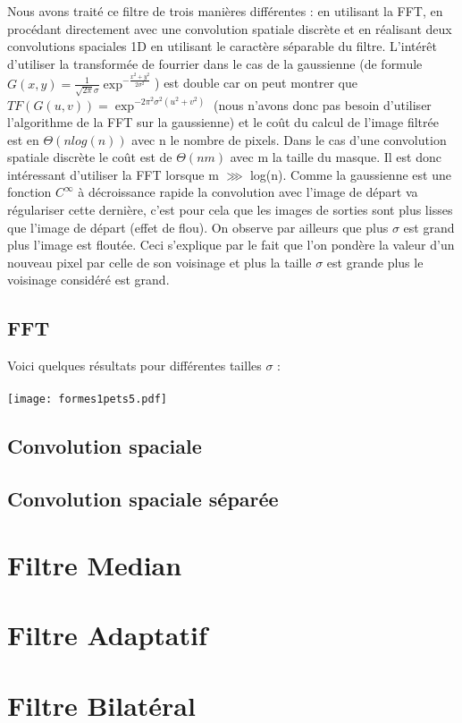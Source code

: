 \documentclass[12pt]{article}
\numberwithin{equation}{section}
\begin{document}
Nous avons traité ce filtre de trois manières différentes : en utilisant la FFT, en procédant directement avec une convolution spatiale discrète et en réalisant deux convolutions spaciales 1D en utilisant le caractère séparable du filtre. L'intérêt d'utiliser la transformée de fourrier dans le cas de la gaussienne (de formule $G(x,y) = \frac{1}{\sqrt{2\pi }\sigma}\exp^{-\frac{x^2 + y^2}{2\sigma^2}}$) est double car on peut montrer que $TF(G(u,v)) = \exp^{-2\pi^2 \sigma^2(u^2 + v^2)}$ (nous n'avons donc pas besoin d'utiliser l'algorithme de la FFT sur la gaussienne) et le coût du calcul de l'image filtrée est en $\Theta(nlog(n))$ avec n le nombre de pixels. Dans le cas d'une convolution spatiale discrète le coût est de $\Theta(nm)$ avec m la taille du masque. Il est donc intéressant d'utiliser la FFT lorsque m $\ggg $ log(n). 
Comme la gaussienne est une fonction $C^\infty$ à décroissance rapide la convolution avec l'image de départ va régulariser cette dernière, c'est pour cela que les images de sorties sont plus lisses que l'image de départ (effet de flou). On observe par ailleurs que plus $\sigma$ est grand plus l'image est floutée. Ceci s'explique par le fait que l'on pondère la valeur d'un nouveau pixel par celle de son voisinage et plus la taille $\sigma$ est grande plus le voisinage considéré est grand.

\subsection{FFT}
Voici quelques résultats pour différentes tailles $\sigma$ : \\\\
\texttt{[image: formes1pets5.pdf]}\\
\subsection{Convolution spaciale}
\subsection{Convolution spaciale séparée}
\section{Filtre Median}

\section{Filtre Adaptatif}

\section{Filtre Bilatéral}
\end{document}
